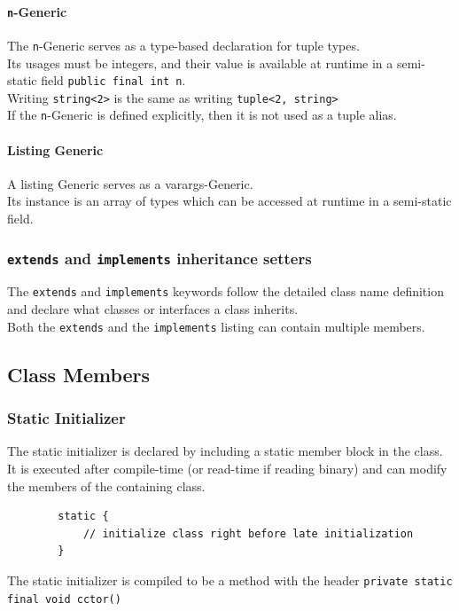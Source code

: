 \documentclass{docs}
\begin{document}
    \label{typeGenN}
    \paragraph{\texttt{n}-Generic} The \texttt{n}-Generic serves as a type-based declaration for tuple types. \\
    Its usages must be integers, and their value is available at runtime in a semi-static field \texttt{public final int n}. \\
    Writing \texttt{string<2>} is the same as writing \texttt{tuple<2, string>} \\
    If the \texttt{n}-Generic is defined explicitly, then it is not used as a tuple alias.
    
    \label{typeGenList}
    \paragraph{Listing Generic} A listing Generic serves as a varargs-Generic. \\
    Its instance is an array of types which can be accessed at runtime in a semi-static field.
    
    \subsubsection{\texttt{extends} and \texttt{implements} inheritance setters}
    The \texttt{extends} and \texttt{implements} keywords follow the detailed class name definition and declare what classes or interfaces a class inherits. \\
    Both the \texttt{extends} and the \texttt{implements} listing can contain multiple members.
    
    \subsection{Class Members}
    
    \label{langCCtor}
    \subsubsection{Static Initializer}
    The static initializer is declared by including a static member block in the class. \\
    It is executed after compile-time (or read-time if reading binary) and can modify the members of the containing class.
    \begin{verbatim}
        static {
            // initialize class right before late initialization
        }
    \end{verbatim}
    The static initializer is compiled to be a method with the header \texttt{private static final void cctor()}
    
\end{document}
